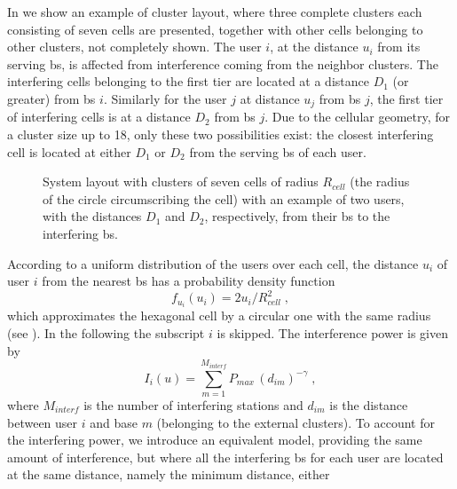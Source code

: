 In  we show an example of cluster layout, where three complete clusters each consisting of seven cells
are presented, together with other cells belonging to other clusters, not completely shown.
The user $i$, at the distance $u_i$ from its serving \gls{bs}, is affected from interference coming from the neighbor
clusters. The interfering cells belonging to the first tier are located at a distance $D_1$ (or greater) from \gls{bs} $i$. Similarly for the user $j$ at distance $u_j$ from \gls{bs} $j$, the first tier of interfering cells is at a distance $D_2$ from \gls{bs} $j$. Due to the cellular geometry, for a cluster size up to 18, only these two possibilities exist: the closest interfering cell is located at either $D_1$ or $D_2$ from the serving \gls{bs} of each user.
\begin{figure}[h]
\begin{center}
\begin{small}
\end{small}
\end{center}
\vspace*{1.2mm}\caption{System layout with clusters of seven cells of radius $R_{cell}$ (the radius of the circle circumscribing the cell) with an example of two users, with the distances $D_1$ and $D_2$, respectively, from their \gls{bs} to the interfering \gls{bs}.}\label{fig:tiers}
\end{figure}
According to a uniform distribution of the users over each cell, the distance $u_i$ of user $i$ from the nearest \gls{bs} has a probability density function
\begin{equation}
    f_{u_i}(u_i)=2u_i/R_{cell}^2\;, \label{density_d}
\end{equation}
which approximates the hexagonal cell by a circular one with the same radius (see ). In the following the subscript $i$ is skipped.
The interference power is given by 
\begin{equation}
      I_i(u) = \sum_{m=1}^{M_{interf}} P_{max}\, \left(d_{im}\right)^{-\gamma}\;,\label{interfexact}
\end{equation}
where $M_{interf}$ is the number of interfering stations and $d_{im}$ is the distance between user $i$ and base $m$ (belonging to the external clusters).
To account for the interfering power, we introduce an equivalent model, providing the same amount of interference, but where all the interfering \gls{bs} for each user are located at the same distance, namely the minimum distance, either
